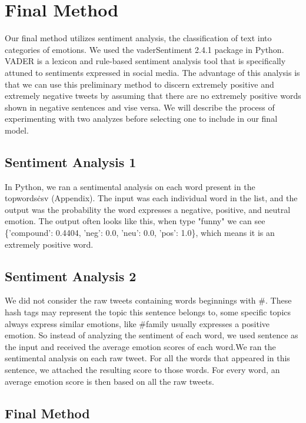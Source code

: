 \documentclass[]{article}
\begin{document}
\section{Final Method}

Our final method utilizes sentiment analysis, the classification of text into categories of emotions. We used the vaderSentiment 2.4.1 package in Python. VADER is a lexicon and rule-based sentiment analysis tool that is specifically attuned to sentiments expressed in social media. The advantage of this analysis is that we can use this preliminary method to discern extremely positive and extremely negative tweets by assuming that there are no extremely positive words shown in negative sentences and vise versa. We will describe the process of experimenting with two analyzes before selecting one to include in our final model.

\subsection{Sentiment Analysis 1}

In Python, we ran a sentimental analysis on each word present in the topwords\.csv (Appendix). The input was each individual word in the list, and the output was the probability the word expresses a negative, positive, and neutral emotion. The output often looks like this, when type "funny" we can see \{'compound': 0.4404, 'neg': 0.0, 'neu': 0.0, 'pos': 1.0\}, which means it is an extremely positive word.

\subsection{Sentiment Analysis 2}

We did not consider the raw tweets containing words beginnings with \#. These hash tags may represent the topic this sentence belongs to, some specific topics always express similar emotions, like \#family usually expresses a positive emotion. So instead of analyzing the sentiment of each word, we used sentence as the input and received the average emotion scores of each word.We ran the sentimental analysis on each raw tweet. For all the words that appeared in this sentence, we attached the resulting score to those words. For every word, an average emotion score is then based on all the raw tweets.

\subsection{Final Method}
\end{document}
